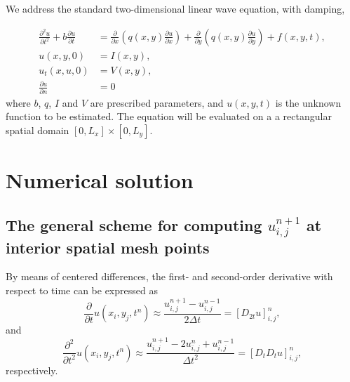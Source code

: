 \documentclass[twoside]{article}
\begin{document}
\label{math:problem}

 

We address the standard two-dimensional linear wave equation, with damping,

\begin{align}
\frac{\partial^2 u}{\partial t^2} + b\frac{\partial u}{\partial t} &= \frac{\partial}{\partial x} \left( q(x,y) \frac{\partial u}{\partial x} \right) + \frac{\partial}{\partial y} \left( q(x,y) \frac{\partial u}{\partial y} \right) + f(x,y,t), \label{eq:wave}\\
u(x,y,0)  &= I(x,y),                         \label{initial:values}\\
u_t(x,u,0) &= V(x,y),                         \label{initial:values:t}\\
\frac{\partial u}{\partial n} &= 0
\end{align}
where $b$, $q$, $I$ and $V$ are prescribed parameters, and $u(x,y,t)$ is
the unknown function to be estimated. The equation will be evaluated on a 
a rectangular spatial domain $\left[0, L_x \right] \times \left[0, L_y \right]$.



\section{Numerical solution}
\label{numerical:problem}
  

\subsection{The general scheme for computing $u_{i,j}^{n+1}$ at interior spatial mesh points}

By means of centered differences, the first- and second-order derivative with respect to time can be expressed as
\begin{equation*}
\frac{\partial}{\partial t} u(x_i, y_j, t^n) \approx \frac{u_{i,j}^{n+1} - u_{i,j}^{n-1}}{2\Delta t} = [D_{2t} u]_{i,j}^n,
\end{equation*}
and
\begin{equation*}
\frac{\partial^2}{\partial t^2} u(x_i, y_j, t^n) \approx \frac{u_{i,j}^{n+1} - 2u_{i,j}^n + u_{i,j}^{n-1}} {\Delta t^2} = \left[D_t D_t u \right]_{i,j}^n,
\end{equation*}
respectively. 
\end{document}
